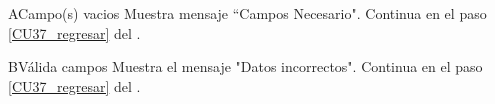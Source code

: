 \begin{UCtrayectoriaA}{A}{Campo(s) vacios}
\UCpaso Muestra mensaje “Campos Necesario".
\UCpaso Continua en el paso \ref{CU37_regresar} del .
\end{UCtrayectoriaA}

\begin{UCtrayectoriaA}{B}{Válida campos}
\UCpaso Muestra el mensaje "Datos incorrectos".
\UCpaso Continua en el paso \ref{CU37_regresar} del .
\end{UCtrayectoriaA}


	


